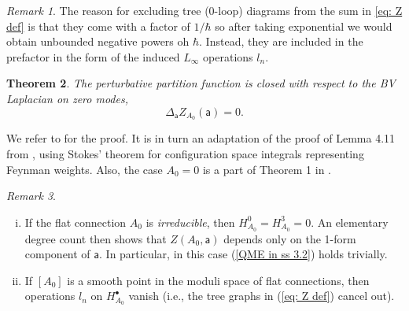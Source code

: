 \documentclass[11pt,a4paper]{amsart}
\theoremstyle{plain} %
\newtheorem{thm}{Theorem}[section]
\theoremstyle{definition}
\theoremstyle{remark}
\newtheorem{rem}[thm]{Remark}
\newcommand{\sfa}{\mathsf{a}}
\newcommand{\bt}{\bullet}
\newcommand{\M}{\mathcal{M}}
\begin{document}
{\begin{rem}
The reason for excluding tree (0-loop) diagrams from the sum in \eqref{eq: Z def} is that they come with a factor of $1/\hbar$ so after taking exponential we would obtain unbounded negative powers oh $\hbar$. Instead, they are included in the prefactor in the form of the induced $L_\infty$ operations $l_n$. 
\end{rem}
\begin{thm}%
    The perturbative partition function is closed with respect to the BV Laplacian on zero modes, 
    \begin{equation} \label{QME in ss 3.2}
        \Delta_\sfa Z_{A_0}(\sfa) = 0.
    \end{equation}
\end{thm}
We refer to \cite[Section 3.4.2]{Wernli2022} for the proof. It is in turn an adaptation of the proof of Lemma 4.11 from \cite{Cattaneo2017}, using Stokes' theorem for configuration space integrals representing Feynman weights.
Also, the case $A_0=0$ is a part of Theorem 1 in \cite{Cattaneo2008}.


\begin{rem} 
    \begin{enumerate}[(i)]
        \item If the flat connection $A_0$ is \emph{irreducible}, then $H^0_{A_0}=H^3_{A_0}=0$. 
        An elementary degree count then shows that $Z(A_0,\sfa)$ depends only on the 1-form component of $\sfa$. In particular, in this case (\ref{QME in ss 3.2}) holds trivially.
        \item If $[A_0]$ is a smooth point in the moduli space of flat connections, then operations $l_n$ on $H^\bt_{A_0}$ vanish (i.e., the tree graphs in (\ref{eq: Z def}) cancel out).
    \end{enumerate}
\end{rem}

}
\end{document}
